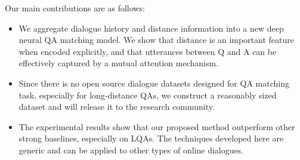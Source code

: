Our main contributions are as follows:
\begin{itemize}
    \item We aggregate dialogue history and distance information into a new deep
neural QA matching model. We show that distance is an important feature when encoded explicitly, and that utterances between Q and A can be effectively captured by a mutual attention mechanism.  %
    \item Since there is no open source dialogue datasets designed for
QA matching task, especially for long-distance QAs, 
we construct a reasonably sized dataset and will release it to the research community. 
    \item The experimental results show that our proposed method outperform 
other strong baselines, especially on LQAs. 
The techniques developed here are generic and can
be applied to other types of online dialogues.
\end{itemize}

